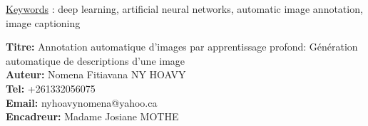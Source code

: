 \vspace{1cm}

\noindent \underline{Keywords} : deep learning, artificial neural networks, automatic image annotation, image captioning

\vspace{0.5cm}
\noindent\textbf{Titre:} Annotation automatique d'images par apprentissage profond: Génération automatique de descriptions d'une image\\
\textbf{Auteur:} Nomena Fitiavana NY HOAVY \\
\textbf{Tel:} +261332056075\\
\textbf{Email:} nyhoavynomena@yahoo.ca\\
\textbf{Encadreur:} Madame Josiane MOTHE
\thispagestyle{empty}